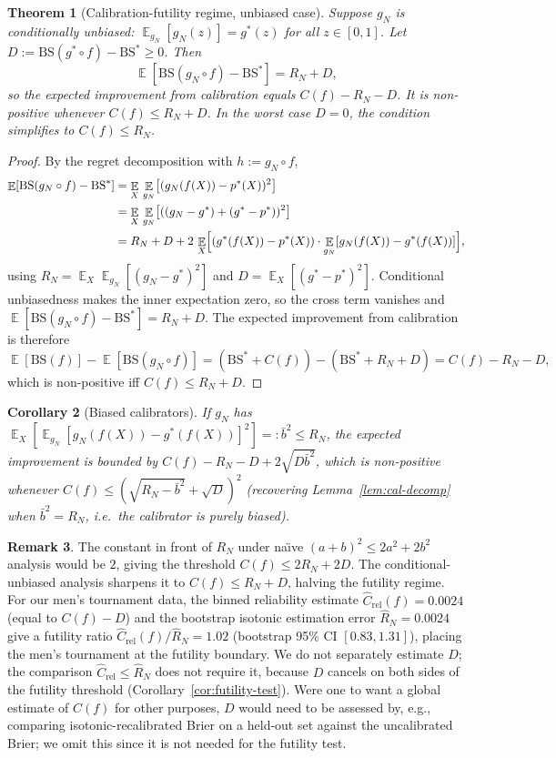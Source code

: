 \documentclass[11pt,a4paper]{article}
\newtheorem{theorem}{Theorem}
\newtheorem{corollary}[theorem]{Corollary}
\theoremstyle{definition}
\newtheorem{remark}[theorem]{Remark}
\DeclareMathOperator{\E}{\mathbb{E}}
\newcommand{\BS}{\mathrm{BS}}
\begin{document}
\begin{theorem}[Calibration-futility regime, unbiased case]\label{thm:futility}
Suppose $g_N$ is conditionally unbiased: $\E_{g_N}[g_N(z)] = g^*(z)$ for all $z \in [0,1]$. Let $D := \BS(g^* \circ f) - \BS^* \ge 0$. Then
\[
\E[\BS(g_N \circ f) - \BS^*] = R_N + D,
\]
so the expected improvement from calibration equals $C(f) - R_N - D$. It is non-positive whenever $C(f) \le R_N + D$. In the worst case $D = 0$, the condition simplifies to $C(f) \le R_N$.
\end{theorem}

\begin{proof}
By the regret decomposition with $h := g_N \circ f$,
\begin{align*}
\E[\BS(g_N \circ f) - \BS^*]
&= \E_X\,\E_{g_N}\bigl[(g_N(f(X)) - p^*(X))^2\bigr]\\
&= \E_X\,\E_{g_N}\bigl[((g_N - g^*) + (g^* - p^*))^2\bigr]\\
&= R_N + D + 2\,\E_X\Bigl[(g^*(f(X)) - p^*(X)) \cdot \E_{g_N}[g_N(f(X)) - g^*(f(X))]\Bigr],
\end{align*}
using $R_N = \E_X \E_{g_N}[(g_N - g^*)^2]$ and $D = \E_X[(g^* - p^*)^2]$. Conditional unbiasedness makes the inner expectation zero, so the cross term vanishes and $\E[\BS(g_N \circ f) - \BS^*] = R_N + D$. The expected improvement from calibration is therefore
\[
\E[\BS(f)] - \E[\BS(g_N \circ f)] = (\BS^* + C(f)) - (\BS^* + R_N + D) = C(f) - R_N - D,
\]
which is non-positive iff $C(f) \le R_N + D$.
\end{proof}

\begin{corollary}[Biased calibrators]\label{cor:biased}
If $g_N$ has $\E_X[\E_{g_N}[g_N(f(X)) - g^*(f(X))]^2] =: \bar{b}^2 \le R_N$, the expected improvement is bounded by $C(f) - R_N - D + 2\sqrt{D \bar{b}^2}$, which is non-positive whenever $C(f) \le (\sqrt{R_N - \bar{b}^2} + \sqrt{D})^2$ (recovering Lemma~\ref{lem:cal-decomp} when $\bar{b}^2 = R_N$, i.e.\ the calibrator is purely biased).
\end{corollary}

\begin{remark}\label{rmk:futility-sharp}
The constant in front of $R_N$ under na\"\i{}ve $(a+b)^2 \le 2a^2 + 2b^2$ analysis would be $2$, giving the threshold $C(f) \le 2 R_N + 2D$. The conditional-unbiased analysis sharpens it to $C(f) \le R_N + D$, halving the futility regime. For our men's tournament data, the binned reliability estimate $\hat{C}_{\text{rel}}(f) = 0.0024$ (equal to $C(f) - D$) and the bootstrap isotonic estimation error $\hat{R}_N = 0.0024$ give a futility ratio $\hat{C}_{\text{rel}}(f) / \hat{R}_N = 1.02$ (bootstrap 95\% CI $[0.83, 1.31]$), placing the men's tournament at the futility boundary. We do not separately estimate $D$; the comparison $\hat{C}_{\text{rel}} \le \hat{R}_N$ does not require it, because $D$ cancels on both sides of the futility threshold (Corollary~\ref{cor:futility-test}). Were one to want a global estimate of $C(f)$ for other purposes, $D$ would need to be assessed by, e.g., comparing isotonic-recalibrated Brier on a held-out set against the uncalibrated Brier; we omit this since it is not needed for the futility test.
\end{remark}
\end{document}
